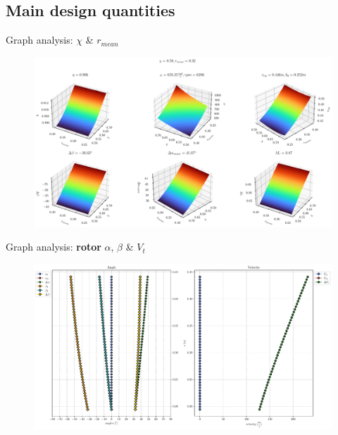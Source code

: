 \subsection{Main design quantities}
	{\nologo
	\begin{frame}{Graph analysis: $\chi$ \& $r_{mean}$}
		\begin{figure}
			\centering
			\includegraphics[width=\textwidth]{figures/rMeanChi.pdf}
		\end{figure}
	\end{frame}	

	\begin{frame}{Graph analysis: \textbf{rotor} $\alpha$, $\beta$ \& $V_{t}$}
		\begin{figure}
			\centering
			\includegraphics[width=\textwidth]{figures/betaAngles.pdf}
		\end{figure}
	\end{frame}
	
}
